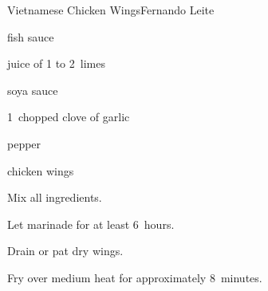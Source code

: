 \begin{recipe}{Vietnamese Chicken Wings}{Fernando Leite}{}

\begin{ingredients}
\item {} fish sauce
\item juice of 1 to 2~limes
\item {} soya sauce
\item 1~chopped clove of garlic
\item pepper
\item chicken wings
\end{ingredients}

\begin{directions}
\item Mix all ingredients.
\item Let marinade for at least 6~hours.
\item Drain or pat dry wings.
\item Fry over medium heat for approximately 8~minutes.
\end{directions}

\end{recipe}
